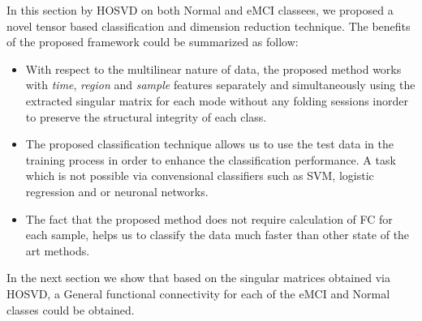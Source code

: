 \documentclass[preprint,12pt]{elsarticle}
\begin{document}
In this section by HOSVD on both Normal and eMCI classees, we proposed a novel tensor based classification and dimension reduction technique. The benefits of the proposed framework could be summarized as follow:
\begin{itemize}
	\item With respect to the multilinear nature of data, the proposed method works with \textit{time}, \textit{region} and \textit{sample} features separately and simultaneously using the extracted singular matrix for each mode without any folding sessions inorder to preserve the structural integrity of each class.  
	
	\item  The proposed classification technique allows us to use the test data in the training process in order to enhance the classification performance. A task which is not possible via convensional classifiers such as SVM, logistic regression  and or neuronal networks. 
	
	\item 
	The fact that the proposed method does not require calculation of FC for each sample, helps us to classify the data much faster than other state of the art methods.
\end{itemize}
 In the next section we show that based
 on the singular matrices obtained via HOSVD, a General functional connectivity for each of the eMCI and Normal classes could be obtained. 
 
\end{document}
